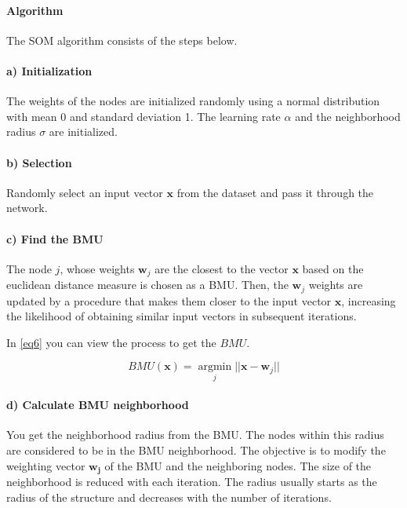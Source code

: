 \documentclass[conference]{IEEEtran}
\begin{document}
\paragraph{Algorithm}
The SOM algorithm consists of the steps below.

\paragraph*{a) Initialization} 

The weights of the nodes are initialized randomly using a normal distribution with mean 0 and standard deviation 1. The learning rate $\alpha$ and the neighborhood radius $\sigma$ are initialized.

\paragraph*{b) Selection} 

Randomly select an input vector $\boldsymbol{x}$ from the dataset and pass it through the network.

\paragraph*{c) Find the BMU} 

The node $j$, whose weights $\boldsymbol{w}_j$ are the closest to the vector $\boldsymbol{x}$ based on the euclidean distance measure is chosen as a BMU. Then, the $\boldsymbol{w}_j$ weights are updated by a procedure that makes them closer to the input vector $\boldsymbol{x}$, increasing the likelihood of obtaining similar input vectors in subsequent iterations.

In \eqref{eq6} you can view the process to get the $BMU$.

\begin{equation}
\label{eq6}
BMU(\boldsymbol{x}) = \operatorname*{argmin}_j ||\boldsymbol{x} - \boldsymbol{w}_j || 
\end{equation}

\paragraph*{d) Calculate BMU neighborhood} 

You get the neighborhood radius from the BMU. The nodes within this radius are considered to be in the BMU neighborhood. The objective is to modify the weighting vector $\boldsymbol{w_j}$ of the BMU and the neighboring nodes. The size of the neighborhood is reduced with each iteration. The radius usually starts as the radius of the structure and decreases with the number of iterations.
\end{document}
